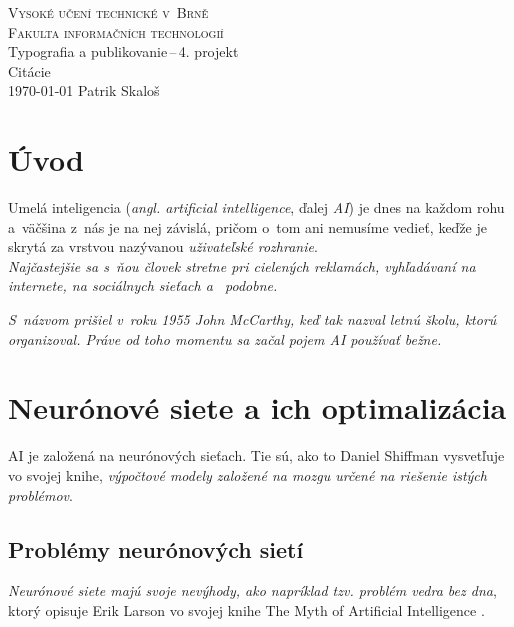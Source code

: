\documentclass[a4paper, 11pt]{article}
\begin{document}
  \begin{titlepage}
    \begin{center}
      \Huge
      \textsc{Vysoké učení technické v~Brně} \\
      \huge\textsc{Fakulta informačních technologií} \\
      \LARGE
      Typografia a publikovanie\,--\,4. projekt\\
      \Huge
      Citácie\\
      {\Large \today\hfill
      Patrik Skaloš}
    \end{center}
  \end{titlepage}


  \section{Úvod}
  Umelá inteligencia (\emph{angl. artificial intelligence}, ďalej \emph{AI}) 
  je dnes na každom rohu a~väčšina z~nás je na nej závislá, pričom o~tom
  ani nemusíme vedieť, keďže je skrytá za vrstvou nazývanou 
  \emph{uživateľské rozhranie}. \\
  \emph{Najčastejšie sa s~ňou človek stretne pri 
  cielených reklamách, vyhľadávaní na internete, na sociálnych sieťach a~
  podobne.} \cite{Markowitz:2020:TakeALookAround}

  \emph{S~názvom  prišiel v~roku 1955 John 
  McCarthy, keď tak nazval letnú školu, ktorú organizoval. Práve od toho 
  momentu sa začal pojem AI používať bežne.}
  \cite{Wooldridge:2021:ABriefHistoryOfArtificialIntelligence} 

  \section{Neurónové siete a ich optimalizácia}
  AI je založená na neurónových sieťach. Tie sú, ako to Daniel Shiffman 
  vysvetľuje vo svojej knihe, \emph{výpočtové modely založené na mozgu určené 
  na riešenie istých problémov}. 
  \cite{Shiffman:2012:TheNatureOfCode}

  \subsection{Problémy neurónových sietí}
  \emph{Neurónové siete majú svoje nevýhody, ako napríklad tzv. problém vedra 
  bez dna}, ktorý opisuje Erik Larson vo svojej knihe The Myth of Artificial 
  Intelligence \cite{Larson:2021:TheMythOfArtificialIntelligence}. 
\end{document}
